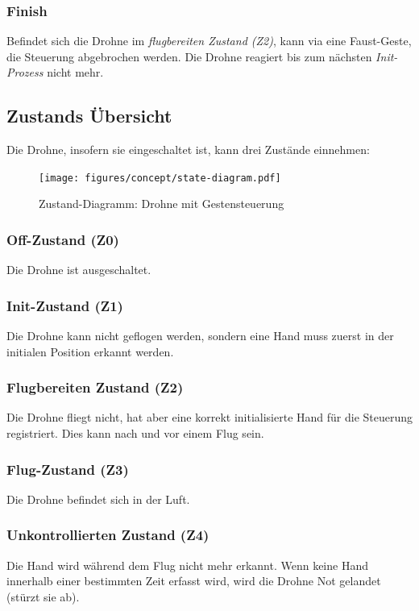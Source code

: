 \subsubsection{Finish}
Befindet sich die Drohne im \textit{flugbereiten Zustand (Z2)}, kann via eine Faust-Geste, die Steuerung abgebrochen werden.
Die Drohne reagiert bis zum nächsten \textit{Init-Prozess} nicht mehr.

\subsection{Zustands Übersicht}
Die Drohne, insofern sie eingeschaltet ist, kann drei Zustände einnehmen:

\begin{figure}[H]
	\centering
	\texttt{[image: figures/concept/state-diagram.pdf]}
	\caption[Zustand-Diagramm: Drohne mit Gestensteuerung]{Zustand-Diagramm: Drohne mit Gestensteuerung}
\end{figure}

\subsubsection{Off-Zustand (Z0)}
Die Drohne ist ausgeschaltet.

\subsubsection{Init-Zustand (Z1)}
Die Drohne kann nicht geflogen werden, sondern eine Hand muss zuerst in der initialen Position erkannt werden.

\subsubsection{Flugbereiten Zustand (Z2)}
Die Drohne fliegt nicht, hat aber eine korrekt initialisierte Hand für die Steuerung registriert. Dies kann nach und vor einem Flug sein.

\subsubsection{Flug-Zustand (Z3)}
Die Drohne befindet sich in der Luft.

\subsubsection{Unkontrollierten Zustand (Z4)}
Die Hand wird während dem Flug nicht mehr erkannt.
Wenn keine Hand innerhalb einer bestimmten Zeit erfasst wird, wird die Drohne Not gelandet (stürzt sie ab).

